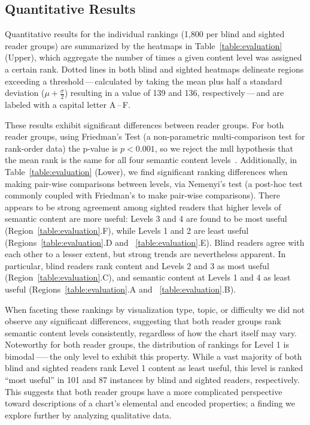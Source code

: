 \subsection{Quantitative Results}


Quantitative results for the individual rankings ({1,800} per blind and sighted reader groups) are summarized by the heatmaps in Table~\ref{table:evaluation} (Upper), which aggregate the number of times a given content level was assigned a certain rank.
Dotted lines in both blind and sighted heatmaps delineate regions exceeding a threshold\,---\,calculated by taking the mean plus half a standard deviation ($\mu + \frac{\sigma}{2}$) resulting in a value of 139 and 136, respectively\,---\,and are labeled with a capital letter A\,--\,F.

These results exhibit significant differences between reader groups.
For both reader groups, using Friedman’s Test (a non-parametric multi-comparison test for rank-order data) the p-value is $p<0.001$, so we reject the null hypothesis that the mean rank is the same for all four semantic content levels~\cite{garcia_advanced_2010}.
Additionally, in Table~\ref{table:evaluation} (Lower), we find significant ranking differences when making pair-wise comparisons between levels, via Nemenyi’s test (a post-hoc test commonly coupled with Friedman's to make pair-wise comparisons).
There appears to be strong agreement among sighted readers that higher levels of semantic content are more useful: Levels 3 and 4 are found to be most useful (Region~\ref{table:evaluation}.F), while Levels 1 and 2 are least useful (Regions~\ref{table:evaluation}.D and ~\ref{table:evaluation}.E).
Blind readers agree with each other to a lesser extent, but strong trends are nevertheless apparent.
In particular, blind readers rank content and Levels 2 and 3 as most useful (Region~\ref{table:evaluation}.C), and semantic content at Levels 1 and 4 as least useful (Regions~\ref{table:evaluation}.A and ~\ref{table:evaluation}.B).

When faceting these rankings by visualization type, topic, or difficulty we did not observe any significant differences, suggesting that both reader groups rank semantic content levels consistently, regardless of how the chart itself may vary.
Noteworthy for both reader groups, the distribution of rankings for Level 1 is bimodal\,—--\,the only level to exhibit this property.
While a {vast majority} of both blind and sighted readers rank Level 1 content as least useful, this level is ranked ``most useful'' in {101} and {87} instances by blind and sighted readers, respectively. This suggests that both reader groups have a more complicated perspective toward descriptions of a chart's elemental and encoded properties; a finding we explore further by analyzing qualitative data.

